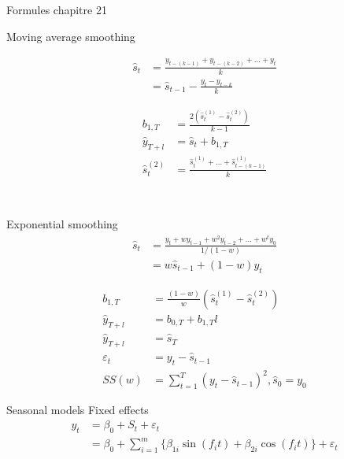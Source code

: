 \documentclass[12pt, titlepage, french]{report}
\begin{document}
\begin{FORMULA_SUMM}{Formules chapitre 21}
\begin{multicols*}{2}
Moving average smoothing

\begin{minipage}[ht]{0.5\linewidth}
\setlength{\mathindent}{-1cm}
\begin{align*}
	\hat{s}_{t}
		&=	\frac{y_{t - (k - 1)} + y_{t - (k - 2)} + \dots + y_{t}}{k}	\\
		&=	\hat{s}_{t - 1} - \frac{y_{t} - y_{t - k}}{k}	
\end{align*}
\setlength{\mathindent}{1cm}
\end{minipage}
\setlength{\mathindent}{-1cm}
\begin{align*}
	b_{1, T}	
		&=	\frac{2(\hat{s}_{t}^{(1)} - \hat{s}_{t}^{(2)})}{k - 1}	\\
	\hat{y}_{T + l}
		&=	\hat{s}_{t} + b_{1, T}	\\
	\hat{s}_{t}^{(2)}	
		&=	\frac{\hat{s}_{t}^{(1)} + \dots + \hat{s}_{t - (k - 1)}^{(1)}}{k}	
\end{align*}
\setlength{\mathindent}{1cm}

\vfill\null
\

\begin{minipage}[ht]{0.5\linewidth}
Exponential smoothing
\setlength{\mathindent}{-1cm}
\begin{align*}
	\hat{s}_{t}
		&=	\frac{y_{t} + w y_{t - 1} + w^{2} y_{t - 2} + \dots + w^{t} y_{0}}{1/(1 - w)}		\\
		&=	w \hat{s}_{t - 1} + (1 - w) y_{t}	
\end{align*}
\setlength{\mathindent}{1cm}
\end{minipage}
\setlength{\mathindent}{-1cm}
\begin{align*}
	b_{1, T}	
		&=	\frac{(1 - w)}{w}\left(\hat{s}_{t}^{(1)} - \hat{s}_{t}^{(2)}\right)	\\
	\hat{y}_{T + l}
		&=	b_{0, T} + b_{1, T} l	\\
	\hat{y}_{T + l}
		&=	\hat{s}_{T}		\\
	\varepsilon_{t}
		&=	y_{t} - \hat{s}_{t - 1}	\\
	SS(w)
		&=	\sum_{t = 1}^{T}(y_{t} - \hat{s}_{t - 1})^{2}, \hat{s}_{0} = y_{0}	
\end{align*}
\setlength{\mathindent}{1cm}
\end{multicols*}

Seasonal models
Fixed effects
\begin{align*}
	y_{t}
		&=	\beta_{0} + S_t + \varepsilon_{t}	\\
		&=	\beta_{0} + \sum_{i = 1}^{m} \{ \beta_{1i} \sin(f_{i}t) + \beta_{2i} \cos(f_{i}t)	 \} + \varepsilon_{t} 
\end{align*}


\end{FORMULA_SUMM}
\end{document}
